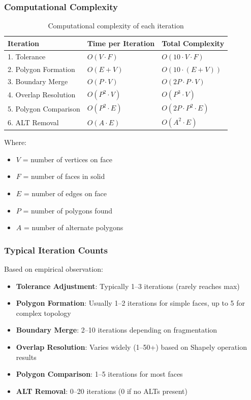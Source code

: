 \subsubsection{Computational Complexity}

\begin{table}[h]
\centering
\caption{Computational complexity of each iteration}
\small
\begin{tabular}{@{}lll@{}}
\toprule
\textbf{Iteration} & \textbf{Time per Iteration} & \textbf{Total Complexity} \\
\midrule
1. Tolerance & $O(V \cdot F)$ & $O(10 \cdot V \cdot F)$ \\
2. Polygon Formation & $O(E + V)$ & $O(10 \cdot (E + V))$ \\
3. Boundary Merge & $O(P \cdot V)$ & $O(2P \cdot P \cdot V)$ \\
4. Overlap Resolution & $O(P^2 \cdot V)$ & $O(P^3 \cdot V)$ \\
5. Polygon Comparison & $O(P^2 \cdot E)$ & $O(2P \cdot P^2 \cdot E)$ \\
6. ALT Removal & $O(A \cdot E)$ & $O(A^2 \cdot E)$ \\
\bottomrule
\end{tabular}
\end{table}

Where:
\begin{itemize}
    \item $V$ = number of vertices on face
    \item $F$ = number of faces in solid
    \item $E$ = number of edges on face
    \item $P$ = number of polygons found
    \item $A$ = number of alternate polygons
\end{itemize}

\subsubsection{Typical Iteration Counts}

Based on empirical observation:

\begin{itemize}
    \item \textbf{Tolerance Adjustment}: Typically 1--3 iterations (rarely reaches max)
    \item \textbf{Polygon Formation}: Usually 1--2 iterations for simple faces, up to 5 for complex topology
    \item \textbf{Boundary Merge}: 2--10 iterations depending on fragmentation
    \item \textbf{Overlap Resolution}: Varies widely (1--50+) based on Shapely operation results
    \item \textbf{Polygon Comparison}: 1--5 iterations for most faces
    \item \textbf{ALT Removal}: 0--20 iterations (0 if no ALTs present)
\end{itemize}

